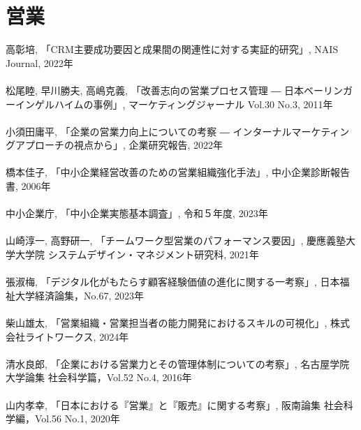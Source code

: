 \section*{営業}
高彰培, 「CRM主要成功要因と成果間の関連性に対する実証的研究」, NAIS Journal, 2022年
\\\\
松尾睦, 早川勝夫, 高嶋克義, 「改善志向の営業プロセス管理 ― 日本ベーリンガーインゲルハイムの事例」, マーケティングジャーナル Vol.30 No.3, 2011年
\\\\
小須田庸平, 「企業の営業力向上についての考察 ― インターナルマーケティングアプローチの視点から」, 企業研究報告, 2022年
\\\\
橋本佳子, 「中小企業経営改善のための営業組織強化手法」, 中小企業診断報告書, 2006年
\\\\
中小企業庁, 「中小企業実態基本調査」, 令和５年度, 2023年
\\\\
山崎淳一, 高野研一, 「チームワーク型営業のパフォーマンス要因」, 慶應義塾大学大学院 システムデザイン・マネジメント研究科, 2021年
\\\\
張淑梅, 「デジタル化がもたらす顧客経験価値の進化に関する一考察」, 日本福祉大学経済論集，No.67, 2023年
\\\\
柴山雄太, 「営業組織・営業担当者の能力開発におけるスキルの可視化」, 株式会社ライトワークス, 2024年
\\\\
清水良郎, 「企業における営業力とその管理体制についての考察」, 名古屋学院大学論集 社会科学篇，Vol.52 No.4, 2016年
\\\\
山内孝幸, 「日本における『営業』と『販売』に関する考察」, 阪南論集 社会科学編，Vol.56 No.1, 2020年

\clearpage
